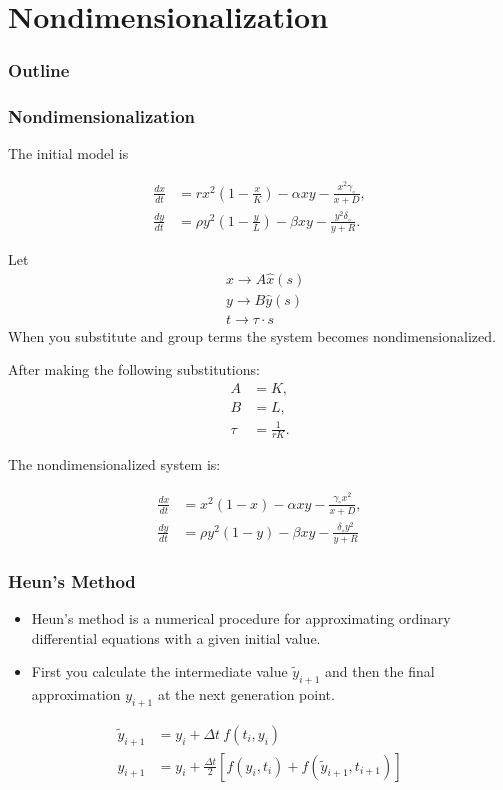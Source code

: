 
\section{Nondimensionalization}
\begin{frame}
  \frametitle{Outline}
  \tableofcontents[ currentsection ]
\end{frame}

\begin{frame}
\frametitle{Nondimensionalization}

The initial model is

  \begin{align*}
    \frac{dx}{dt} & = rx^2 \left(1-\frac{x}{K}\right) - \alpha xy - \frac{x^2 \gamma_\circ}{x+D}, \\
    \frac{dy}{dt} & = \rho y^2 \left(1-\frac{y}{L}\right) - \beta xy -\frac{y^2 \delta_\circ}{y+R}.
  \end{align*}
	
Let 
\begin{align*}
		& x \rightarrow A \hat{x} (s) \\
		& y \rightarrow B \hat{y} (s) \\
		& t \rightarrow \tau \cdot s
\end{align*}
When you substitute and group terms the system becomes nondimensionalized. 
\end{frame}

\begin{frame}
After making the following substitutions: \\
\begin{align*}
		A &= K, \\
		B &= L, \\
		\tau &= \frac{1}{rK}.	
\end{align*}

The nondimensionalized system is:

	\begin{align*}
		\frac{dx}{dt} &= x^2 (1-x) - \alpha xy - \frac{\gamma_\circ x^2}{x+D}, \\
    \frac{dy}{dt} &= \rho y^2 (1-y) - \beta xy -\frac{\delta_\circ y^2}{y+R}
	\end{align*}
\end{frame}


\begin{frame}
\frametitle{Heun's Method}
\begin{itemize}
\item Heun's method is a numerical procedure for approximating ordinary differential equations with a given initial value.
\item First you calculate the intermediate value $\tilde{y}_{i+1}$ and then the final approximation $y_{i+1}$ at the next generation point.
\end{itemize}

\begin{align*}
	\tilde{y}_{i+1} &= y_i + \Delta t \ f(t_i, y_i) \\
	y_{i+1} &= y_i + \frac{\Delta t}{2} \left[f(y_i,t_i) + f(\tilde{y}_{i+1}, t_{i+1})\right]
\end{align*}
\end{frame}


